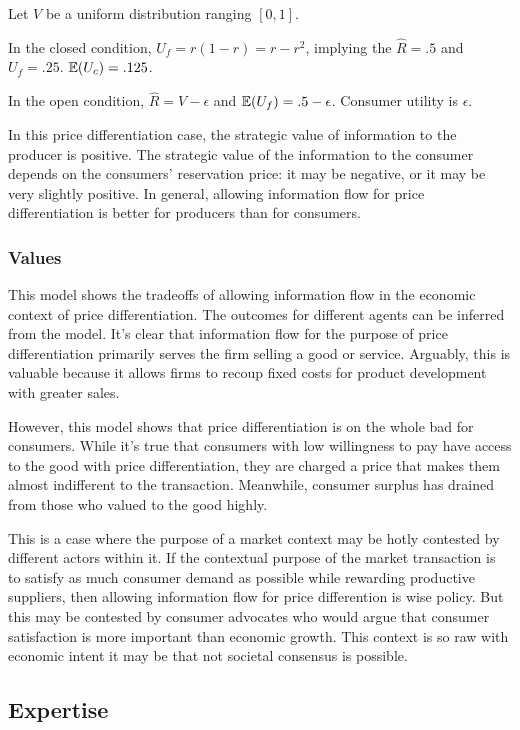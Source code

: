 \documentclass[../thesis.tex]{subfiles}
\begin{document}
\begin{exm}
  Let $V$ be a uniform distribution ranging $[0,1]$.
  
  In the closed condition, $U_f = r (1 - r) = r - r^2$,
  implying the $\hat{R} = .5$ and $U_f = .25$.
  $\mathbb{E}(U_c) = .125$.

  In the open condition, $\hat{R} = V - \epsilon$
  and $\mathbb{E}(U_f) = .5 - \epsilon$.
  Consumer utility is $\epsilon$.
\end{exm}

In this price differentiation case, the strategic
value of information to the producer is positive.
The strategic value of the information to the consumer
depends on the consumers' reservation price: it may
be negative, or it may be very slightly positive.
In general, allowing information flow for price
differentiation is better for producers than for
consumers.

\subsubsection{Values}

This model shows the tradeoffs of allowing information
flow in the economic context of price differentiation.
The outcomes for different agents can be inferred from
the model.
It's clear that information flow for the purpose of
price differentiation primarily serves the firm
selling a good or service.
Arguably, this is valuable because it allows firms
to recoup fixed costs for product development with
greater sales.

However, this model shows that price differentiation
is on the whole bad for consumers.
While it's true that consumers with low willingness
to pay have access to the good with price differentiation,
they are charged a price that makes them almost
indifferent to the transaction.
Meanwhile, consumer surplus has drained from those
who valued to the good highly.

This is a case where the purpose of a market context
may be hotly contested by different actors within it.
If the contextual purpose of the market
transaction is to satisfy as much consumer demand as
possible while rewarding productive suppliers,
then allowing information flow for price differention
is wise policy.
But this may be contested by consumer advocates who
would argue that consumer satisfaction is more important
than economic growth.
This context is so raw with economic intent it may be
that not societal consensus is possible.

\subsection{Expertise}
\label{sec:expertise}
\end{document}
